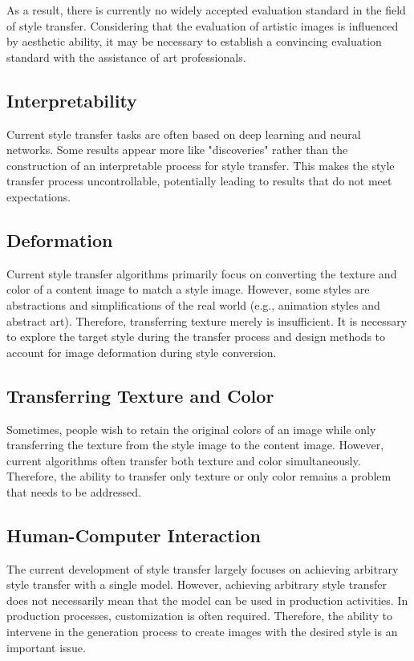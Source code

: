 As a result, there is currently no widely accepted evaluation standard in the field of style transfer. Considering that the evaluation of artistic images is influenced by aesthetic ability, it may be necessary to establish a convincing evaluation standard with the assistance of art professionals.

\subsection{Interpretability}

Current style transfer tasks are often based on deep learning and neural networks. Some results appear more like "discoveries" rather than the construction of an interpretable process for style transfer\citep{23ulyanov2016texture}. This makes the style transfer process uncontrollable, potentially leading to results that do not meet expectations.

\subsection{Deformation}

Current style transfer algorithms primarily focus on converting the texture and color of a content image to match a style image. However, some styles are abstractions and simplifications of the real world (e.g., animation styles and abstract art). Therefore, transferring texture merely is insufficient. It is necessary to explore the target style during the transfer process and design methods to account for image deformation during style conversion.

\subsection{Transferring Texture and Color}

Sometimes, people wish to retain the original colors of an image while only transferring the texture from the style image to the content image. However, current algorithms often transfer both texture and color simultaneously. Therefore, the ability to transfer only texture or only color remains a problem that needs to be addressed.


\subsection{Human-Computer Interaction}

The current development of style transfer largely focuses on achieving arbitrary style transfer with a single model. However, achieving arbitrary style transfer does not necessarily mean that the model can be used in production activities. In production processes, customization is often required. Therefore, the ability to intervene in the generation process to create images with the desired style is an important issue.